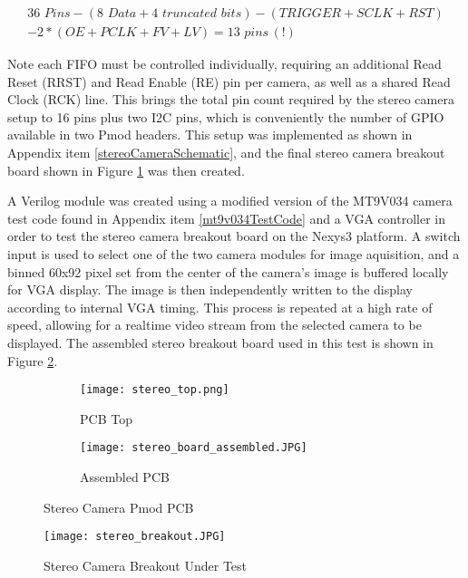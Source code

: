 \begin{equation}
\label{lowerPincount}
\begin{split}
36\,\, Pins - (8\,\,Data + 4 \,\,truncated\,\,bits) - (TRIGGER+SCLK+RST) \\ - 2*(OE+PCLK+FV+LV) = 13\,\,pins\,(!) 
\end{split}
\end{equation}
\par
Note each FIFO must be controlled individually, requiring an additional Read Reset (RRST) and Read Enable (RE) pin per camera, as well as a shared Read Clock (RCK) line. This brings the total pin count required by the stereo camera setup to 16 pins plus two I2C pins, which is conveniently the number of GPIO available in two Pmod headers. This setup was implemented as shown in Appendix item \ref{stereoCameraSchematic}, and the final stereo camera breakout board shown in Figure \ref{stereoCameraBoard} was then created.  
\par
A Verilog module was created using a modified version of the MT9V034 camera test code found in Appendix item \ref{mt9v034TestCode} and a VGA controller in order to test the stereo camera breakout board on the Nexys3 platform. A switch input is used to select one of the two camera modules for image aquisition, and a binned 60x92 pixel set from the center of the camera's image is buffered locally for VGA display. The image is then independently written to the display according to internal VGA timing. This process is repeated at a high rate of speed, allowing for a realtime video stream from the selected camera to be displayed. The assembled stereo breakout board used in this test is shown in Figure \ref{stereoTestSetup}.
\begin{figure}[H] 
	\begin{subfigure}{1\textwidth}
	\centering
		\texttt{[image: stereo\_top.png]}
		\caption{PCB Top}
	\end{subfigure}
	\begin{subfigure}{1\textwidth}
	\centering
		\texttt{[image: stereo\_board\_assembled.JPG]}
		\caption{Assembled PCB}
	\end{subfigure}
	\caption{Stereo Camera Pmod PCB}
	\label{stereoCameraBoard}
\end{figure}
\par
\begin{figure}[H] 
	\centering
	\texttt{[image: stereo\_breakout.JPG]}
	\caption{Stereo Camera Breakout Under Test}
	\label{stereoTestSetup}
\end{figure}
